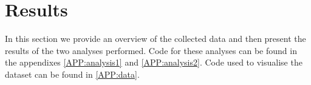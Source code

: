 \chapter{Results}

In this section we provide an overview of the collected data and then present the results of the two analyses performed. Code for these analyses can be found in the appendixes \ref{APP:analysis1} and \ref{APP:analysis2}. Code used to visualise the dataset can be found in \ref{APP:data}.



